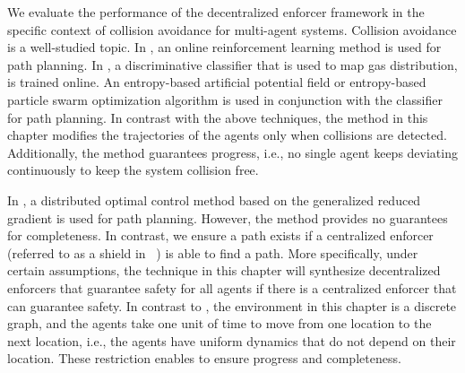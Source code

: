 We evaluate the performance of the decentralized enforcer framework in the specific context of collision avoidance for multi-agent systems.
Collision avoidance is a well-studied topic. In \cite{Zhu2020AdaptiveOD}, an online reinforcement learning method is used for path planning. 
In \cite{Zhu2019}, a discriminative classifier that is used to map gas distribution, is trained online. An entropy-based artificial potential field or entropy-based particle swarm optimization algorithm is used in conjunction with the classifier for path planning. In contrast with the above techniques, the method in this chapter modifies the trajectories of the agents only when collisions are detected. Additionally, the method guarantees progress, i.e., no single agent keeps deviating continuously to keep the system collision free. 
 
In \cite{Rudd2017}, a distributed optimal control method based on the generalized reduced gradient is used for path planning. However, the method provides no guarantees for completeness. In contrast, we ensure a path exists if a centralized enforcer (referred to as a shield in ~\cite{multiagentshield}) is able to find a path. More specifically, under certain assumptions, the technique in this chapter will synthesize decentralized enforcers that guarantee safety for all agents if there is a centralized enforcer that can guarantee safety. %
In contrast to \cite{AlAbri2020ADO}, the environment in this chapter is a discrete graph, and the agents take one unit of time to move from one location to the next location, i.e., the agents have uniform dynamics that do not depend on their location. These restriction enables to ensure progress and completeness.


